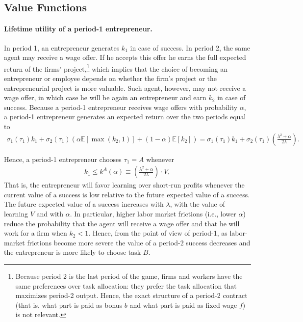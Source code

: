 \documentclass[12pt,american]{paper}
\theoremstyle{remark}
\begin{document}
 
\subsection{Value Functions}
 

\paragraph{Lifetime utility of a period-1 entrepreneur.}
In period 1, an entrepreneur generates $k_1$ in case of success. In period 2, the same agent may receive a wage offer.  If he accepts this offer he earns the full expected return of the firms' project,\footnote{Because period 2 is the last period of the game, firms and workers have the same preferences over task allocation: they prefer the task allocation that maximizes period-2 output. Hence, the exact structure of a period-2 contract (that is, what part is paid as bonus $b$ and what part is paid as fixed wage $f$) is not relevant. } which implies that the choice of becoming an entrepreneur or employee depends on whether the firm's project   or the entrepreneurial project  is more valuable. Such agent, however, may not receive a wage offer, in which case  he will be again an entrepreneur and earn $k_2$ in case of success. Because a period-1 entrepreneur   receives wage offers with probability $\alpha$, a period-1 entrepreneur generates an expected return over the two periods equal to
\begin{align*} 
\sigma_1(\tau_1) k_1+ \sigma_2(\tau_1)\left(\alpha \mathbb E[\max(k_2,1)]+(1-\alpha)\mathbb E[k_2] \right) = \sigma_1(\tau_1) k_1 + \sigma_2(\tau_1)  \left(   \frac{\lambda^2+  \alpha}{2 \lambda}  \right).
\end{align*}

Hence, a period-1 entrepreneur chooses $\tau_1=A$ whenever
\begin{align}\label{eq: optimal entrepreneur}
k_1\leq k^A(\alpha) \equiv    \left(  \frac{\lambda^2+ \alpha}{2 \lambda} \right)  \cdot V,
\end{align}
That is, the entrepreneur will favor learning over short-run profits whenever the current value of a success is low relative to the future expected value of a success. The future expected value of a success increases with $\lambda$, with the value of learning $V$ and with $\alpha$. In particular, higher labor market frictions (i.e., lower $\alpha$) reduce the probability that the agent will receive a wage offer and that he will work for a firm when $k_2<1$. Hence, from the point of view of period-1, as labor-market frictions become more severe the value of a period-2 success decreases and the entrepreneur is more likely to choose task $B$.  
\end{document}
